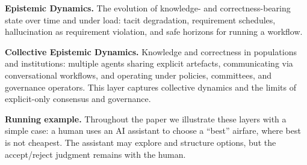 \documentclass[preprints,accept]{Definitions/mdpi}
\theoremstyle{definition}
\begin{document}
\textbf{Epistemic Dynamics.}
The evolution of knowledge- and correctness-bearing state over time and under load: tacit degradation, requirement schedules, hallucination as requirement violation, and safe horizons for running a workflow.

\textbf{Collective Epistemic Dynamics.}
Knowledge and correctness in populations and institutions: multiple agents sharing explicit artefacts, communicating via conversational workflows, and operating under policies, committees, and governance operators. This layer captures collective dynamics and the limits of explicit-only consensus and governance.

\textbf{Running example.}
Throughout the paper we illustrate these layers with a simple case: a human uses an AI assistant to choose a ``best'' airfare, where best is not cheapest. The assistant may explore and structure options, but the accept/reject judgment remains with the human.
\end{document}
